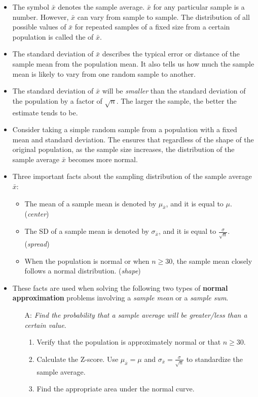 \begin{itemize}
\item The symbol $\bar{x}$ denotes the sample average.  $\bar{x}$ for any particular sample is a number.  However, $\bar{x}$ can vary from sample to sample.  The distribution of all possible values of $\bar{x}$ for repeated samples of a fixed size from a certain population is called the  of $\bar{x}$.

\item The standard deviation of $\bar{x}$ describes the typical error or distance of the sample mean from the population mean.  It also tells us how much the sample mean is likely to vary from one random sample to another.  

\item The standard deviation of $\bar{x}$ will be \textit{smaller} than the standard deviation of the population by a factor of $\sqrt{n}$.  The larger the sample, the better the estimate tends to be.

\item Consider taking a simple random sample from a population with a fixed mean and standard deviation.  The  ensures that regardless of the shape of the original population, as the sample size increases, the distribution of the sample average $\bar{x}$ becomes more normal.  

\item Three important facts about the sampling distribution of the sample average $\bar{x}$:
\begin{itemize}\vspace{-1mm}
\setlength{\itemsep}{0mm}
\item The mean of a sample mean is denoted by $\mu_{\bar{x}}$, and it is equal to $\mu$. (\textit{center})
\item The SD of a sample mean is denoted by $\sigma_{\bar{x}}$, and it is equal to $\frac{\sigma}{\sqrt{n}}$.  (\textit{spread})
\item When the population is normal or when $n\ge 30$, the sample mean closely follows a normal distribution.   (\textit{shape})
\end{itemize}

\item These facts are used when solving the following two types of \textbf{normal approximation} problems involving a \emph{sample mean} or a \emph{sample sum}.  
\begin{itemize}
\item[A:] \textit{Find the probability that a sample average will be greater/less than a certain value}.
\begin{enumerate}\vspace{-1mm}
\setlength{\itemsep}{0mm}
\item Verify that the population is approximately normal or that $n \ge 30$.
\item Calculate the Z-score.  Use $\mu_{\bar{x}}=\mu$ and $\sigma_{\bar{x}}=\frac{\sigma}{\sqrt{n}}$ to standardize the sample average.  
\item Find the appropriate area under the normal curve.  
\end{enumerate}


\end{itemize}
\end{itemize}
